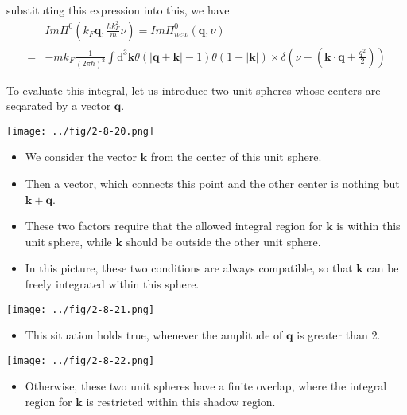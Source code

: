 substituting this expression into this, we have
\[\begin{split}& Im\Pi^0(k_F \mathbf{q}, \frac{\hbar k_F^2}{m}\nu) = Im\Pi^0_{new}(\mathbf{q},\nu)\\
=& -m k_F \frac{1}{(2\pi \hbar)^2} \int \mathrm{d}^3 \mathbf{k} \theta(|\mathbf{q}+\mathbf{k}|-1) \theta(1-|\mathbf{k}|) \times \delta(\nu-(\mathbf{k}\cdot \mathbf{q}+\frac{q^2}{2})) \end{split}\]

To evaluate this integral, let us introduce two unit spheres whose centers are seqarated by a vector $\mathbf{q}$.

\begin{center} \label{Fig2.8.20}
\texttt{[image: ../fig/2-8-20.png]}
\end{center}
\begin{itemize}
\item We consider the vector $\mathbf{k}$ from the center of this unit sphere.

\item Then a vector, which connects this point and the other center is nothing but $\mathbf{k}+\mathbf{q}$.

\item These two factors require that the allowed integral region for $\mathbf{k}$ is within this unit sphere, while $\mathbf{k}$ should be outside the other unit sphere.

\item In this picture, these two conditions are always compatible, so that $\mathbf{k}$ can be freely integrated within this sphere.
\end{itemize}

\begin{center} \label{Fig2.8.21}
\texttt{[image: ../fig/2-8-21.png]}
\end{center}
\begin{itemize}
\item This situation holds true, whenever the amplitude of $\mathbf{q}$ is greater than 2.
\end{itemize}

\begin{center} \label{Fig2.8.22}
\texttt{[image: ../fig/2-8-22.png]}
\end{center}
\begin{itemize}
\item Otherwise, these two unit spheres have a finite overlap, where the integral region for $\mathbf{k}$ is restricted within this shadow region.
\end{itemize}

